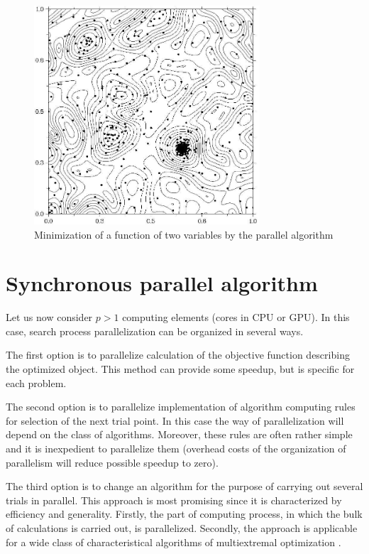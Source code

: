 \documentclass[smallcondensed]{svjour3}     %
\begin{document}
\begin{figure}
	\center
  \includegraphics[width=0.75\textwidth]{fig3.jpg} 
  \caption{Minimization of a function of two variables by the parallel algorithm}
  \label{fig:2}
\end{figure}

\section{Synchronous parallel algorithm} \label{sec:3}

Let us now consider $p>1$ computing elements (cores in CPU or GPU). In this case, search process parallelization can be organized in several ways.

The first option is to parallelize calculation of the objective function describing the optimized object. This method can provide some speedup, but is specific for each problem.

The second option is to parallelize implementation of algorithm computing rules for selection of the next trial point. In this case the way of parallelization will depend on the class of algorithms. Moreover, these rules are often rather simple and it is inexpedient to parallelize them (overhead costs of the organization of parallelism will reduce possible speedup to zero).

The third option is to change an algorithm for the purpose of carrying out several trials in parallel. This approach is most promising since it is characterized by efficiency and generality. Firstly, the part of computing process, in which the bulk of calculations is carried out, is parallelized. Secondly, the approach is applicable for a wide class of characteristical algorithms of multiextremal optimization \cite{RefSergeyev1994,RefSergeyevGrishagin,RefGrishagin1997,RefGrishagin2001}.
\end{document}
